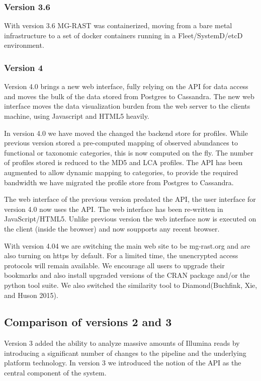 \documentclass[letterpaper,10pt,english]{sphinxmanual}
\begin{document}
\subsubsection{Version 3.6}
\label{\detokenize{user_manual:version-3-6}}
With version 3.6 MG-RAST was containerized, moving from a bare metal
infrastructure to a set of docker containers running in a
Fleet/SystemD/etcD environment.


\subsubsection{Version 4}
\label{\detokenize{user_manual:version-4}}
Version 4.0 brings a new web interface, fully relying on the API for
data access and moves the bulk of the data stored from Postgres to
Cassandra. The new web interface moves the data visualization burden
from the web server to the clients machine, using Javascript and HTML5
heavily.

In version 4.0 we have moved the changed the backend store for profiles.
While previous version stored a pre-computed mapping of observed
abundances to functional or taxonomic categories, this is now computed
on the fly. The number of profiles stored is reduced to the MD5 and LCA
profiles. The API has been augmented to allow dynamic mapping to
categories, to provide the required bandwidth we have migrated the
profile store from Postgres to Cassandra.

The web interface of the previous version predated the API, the user
interface for version 4.0 now uses the API. The web interface has been
re-written in JavaScript/HTML5. Unlike previous version the web
interface now is executed on the client (inside the browser) and now
soupports any recent browser.

With version 4.04 we are switching the main web site to be mg-rast.org
and are also turning on https by default. For a limited time, the
unencrypted access protocols will remain available. We encourage all
users to upgrade their bookmarks and also install upgraded versions of
the CRAN package and/or the python tool suite. We also switched the
similarity tool to Diamond(Buchfink, Xie, and Huson 2015).


\subsection{Comparison of versions 2 and 3}
\label{\detokenize{user_manual:comparison-of-versions-2-and-3}}
Version 3 added the ability to analyze massive amounts of Illumina reads
by introducing a significant number of changes to the pipeline and the
underlying platform technology. In version 3 we introduced the notion of
the API as the central component of the system.
\end{document}
